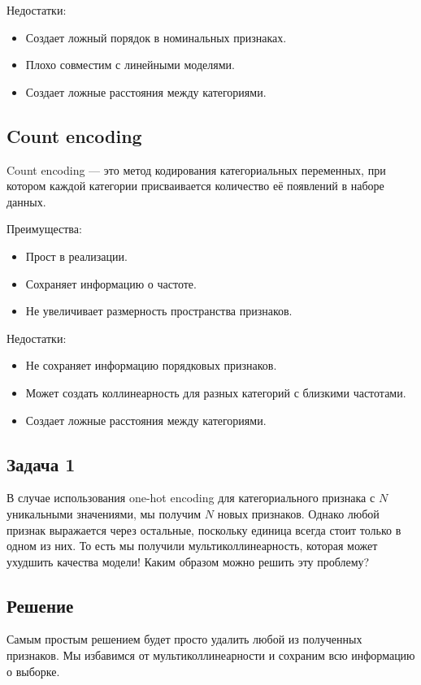 Недостатки:
\begin{itemize}
	\item Создает ложный порядок в номинальных признаках.
	\item Плохо совместим с линейными моделями.
	\item Создает ложные расстояния между категориями.
\end{itemize}

\subsection*{Count encoding}

Count encoding — это метод кодирования категориальных переменных, при котором каждой категории присваивается количество её появлений в наборе данных. 
	
Преимущества:
\begin{itemize}
	\item Прост в реализации.
	\item Сохраняет информацию о частоте.
	\item Не увеличивает размерность пространства признаков.
\end{itemize}

Недостатки:
\begin{itemize}
	\item Не сохраняет информацию порядковых признаков.
	\item Может создать коллинеарность для разных категорий с близкими частотами.
	\item Создает ложные расстояния между категориями.
\end{itemize}

\subsection*{Задача 1}

В случае использования one-hot encoding для категориального признака с $N$ уникальными значениями, мы получим $N$ новых признаков. Однако любой признак выражается через остальные, поскольку единица всегда стоит только в одном из них. То есть мы получили мультиколлинеарность, которая может ухудшить качества модели! Каким образом можно решить эту проблему?

\subsection*{Решение}

Самым простым решением будет просто удалить любой из полученных признаков. Мы избавимся от мультиколлинеарности и сохраним всю информацию о выборке.

